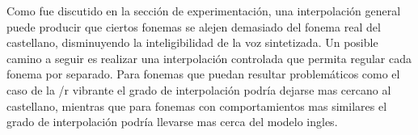 
Como fue discutido en la sección de experimentación, una interpolación general puede producir que ciertos fonemas se alejen demasiado del fonema real del castellano, disminuyendo la inteligibilidad de la voz sintetizada. Un posible camino a seguir es realizar una interpolación controlada que permita regular cada fonema por separado. Para fonemas que puedan resultar problemáticos como el caso de la /r vibrante el grado de interpolación podría dejarse mas cercano al castellano, mientras que para fonemas con comportamientos mas similares el grado de interpolación podría llevarse mas cerca del modelo ingles.


